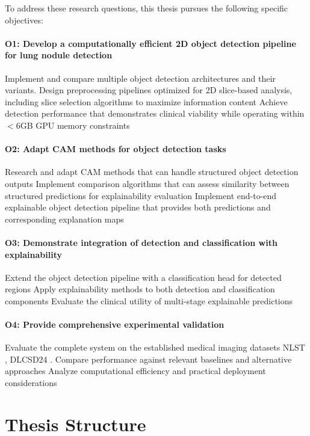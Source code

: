 To address these research questions, this thesis pursues the following specific objectives:
\paragraph{O1: Develop a computationally efficient 2D object detection pipeline for lung nodule detection}
Implement and compare multiple object detection architectures and their variants.
Design preprocessing pipelines optimized for 2D slice-based analysis, including slice selection algorithms to maximize information content
Achieve detection performance that demonstrates clinical viability while operating within $<$6GB GPU memory constraints

\paragraph{O2: Adapt CAM methods for object detection tasks}

Research and adapt CAM methods that can handle structured object detection outputs
Implement comparison algorithms that can assess similarity between structured predictions for explainability evaluation
Implement end-to-end explainable object detection pipeline that provides both predictions and corresponding explanation maps

\paragraph{O3: Demonstrate integration of detection and classification with explainability}

Extend the object detection pipeline with a classification head for detected regions
Apply explainability methods to both detection and classification components
Evaluate the clinical utility of multi-stage explainable predictions

\paragraph{O4: Provide comprehensive experimental validation}
Evaluate the complete system on the established medical imaging datasets NLST \cite{nlst_data}, DLCSD24 \cite{tushar2025ailunghealthbenchmarking}.
Compare performance against relevant baselines and alternative approaches
Analyze computational efficiency and practical deployment considerations

\section{Thesis Structure}